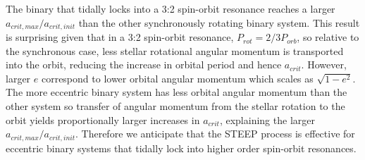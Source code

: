 The binary that tidally locks into a 3:2 spin-orbit resonance reaches a larger $a_{crit,max}/a_{crit,init}$ than the other synchronously rotating binary system.  This result is surprising given that in a 3:2 spin-orbit resonance, $P_{rot} = 2/3 P_{orb}$, so relative to the synchronous case, less stellar rotational angular momentum is transported into the orbit, reducing the increase in orbital period and hence $a_{crit}$.  However, larger $e$ correspond to lower orbital angular momentum which scales as $\sqrt{1-e^2}$.  The more eccentric binary system has less orbital angular momentum than the other system so transfer of angular momentum from the stellar rotation to the orbit yields proportionally larger increases in $a_{crit}$, explaining the larger $a_{crit,max}/a_{crit,init}$.  Therefore we anticipate that the STEEP process is effective for eccentric binary systems that tidally lock into higher order spin-orbit resonances.

